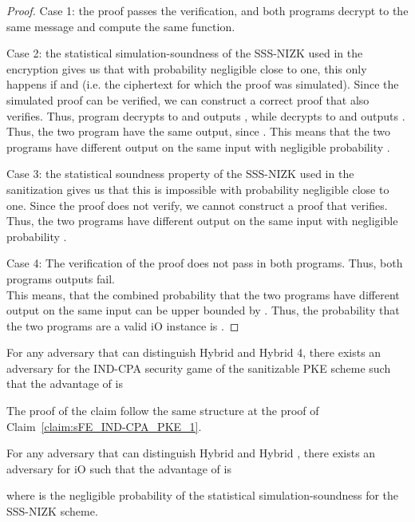 \documentclass{llncs}
\begin{document}
\begin{proof}
Case 1: the proof  passes the verification, and both programs  decrypt to the same message and compute the same function. 

Case 2: the statistical simulation-soundness of the SSS-NIZK used in the encryption gives us that with probability negligible close to one, this only happens if  and  (i.e. the ciphertext for which the proof was simulated). Since the simulated proof can be verified, we can construct a correct proof  that also verifies. Thus, program  decrypts  to  and outputs , while  decrypts  to  and outputs . Thus, the two program have the same output, since . 
This means that the two programs have different output on the same input with negligible probability .

Case 3: the statistical soundness property of the SSS-NIZK used in the sanitization gives us that this is impossible with probability negligible close to one. Since the proof  does not verify, we cannot construct a proof  that verifies. 
Thus, the two programs have different output on the same input with negligible probability .

Case 4: The verification of the proof  does not pass in both programs. Thus, both programs outputs fail. \\

This means, that the combined probability that the two programs have different output on the same input can be upper bounded by  . Thus, the probability that the two programs are a valid iO instance is .
\end{proof}



\begin{claim} \label{claim:sFE_IND-CPA_PKE_2}
For any adversary  that can distinguish Hybrid  and Hybrid 4, there exists an adversary  for the IND-CPA security game of the sanitizable PKE scheme such that the advantage of  is
	
\end{claim}

The proof of the claim follow the same structure at the proof of Claim~\ref{claim:sFE_IND-CPA_PKE_1}.

\begin{claim} \label{claim:sFE_IND-CPA_iO_2}
For any adversary  that can distinguish Hybrid  and Hybrid , there exists an adversary  for iO such that the advantage of  is
	
	where  is the negligible probability of the statistical simulation-soundness for the SSS-NIZK scheme. \\
\end{claim}
\end{document}
